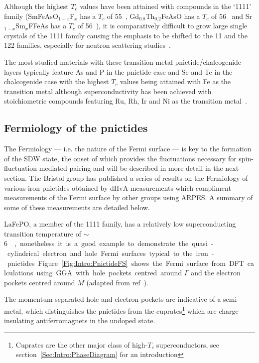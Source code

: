 Although the highest $T_c$ values have been attained with compounds in the `1111' family (SmFeAsO$_{1-x}$F$_x$ has a $T_c$ of \unit{55}{\kelvin}~\cite{Ren2008}, Gd$_0.8$Th$_{0.2}$FeAsO has a $T_c$ of \unit{56}{\kelvin}~\cite{Wang2008} and Sr$_{1-x}$Sm$_x$FFeAs has a $T_c$ of \unit{56}{\kelvin}~\cite{Wu2009}), it is comparatively difficult to grow large single crystals of the 1111 family causing the emphasis to be shifted to the 11 and the 122 families, especially for neutron scattering studies~\cite{Johnston2010}.

The most studied materials with these transition metal-pnictide/chalcogenide layers typically feature As and P in the pnictide case and Se and Te in the chalcogenide case with the highest $T_c$ values being attained with Fe as the transition metal although superconductivity has been achieved with stoichiometric compounds featuring Ru, Rh, Ir and Ni as the transition metal~\cite{Johnston2010}.



\subsection{Fermiology of the pnictides}

The Fermiology --- i.e. the nature of the Fermi surface --- is key to the formation of the \ac{SDW} state, the onset of which provides the fluctuations necessary for spin-fluctuation mediated pairing and will be described in more detail in the next section. The Bristol group has published a series of results on the Fermiology of various iron-pnictides obtained by \ac{dHvA} measurements which compliment measurements of the Fermi surface by other groups using \ac{ARPES}. A summary of some of these measurements are detailed below.

LaFePO, a member of the 1111 family, has a relatively low superconducting transition temperature of \unit{$\sim$6}{\kelvin}, nonetheless it is a good example to demonstrate the quasi-cylindrical electron and hole Fermi surfaces typical to the iron-pnictides. Figure~\ref{Fig:Intro:PnictideFS} shows the Fermi surface from \ac{DFT} calculations using \ac{GGA} with hole pockets centred around $\Gamma$ and the electron pockets centred around $M$ (adapted from ref~\cite{Carrington2009}).

The momentum separated hole and electron pockets are indicative of a semi-metal, which distinguishes the pnictides from the cuprates\footnote{Cuprates are the other major class of high-$T_c$ superconductors, see section~\ref{Sec:Intro:PhaseDiagram} for an introduction} which are charge insulating antiferromagnets in the undoped state. 

